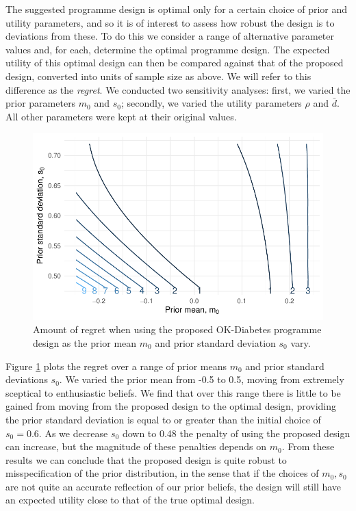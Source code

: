 \documentclass[sagev, Crown]{sagej} %
\begin{document}
The suggested programme design is optimal only for a certain choice of prior and utility parameters, and so it is of interest to assess how robust the design is to deviations from these. To do this we consider a range of alternative parameter values and, for each, determine the optimal programme design. The expected utility of this optimal design can then be compared against that of the proposed design, converted into units of sample size as above. We will refer to this difference as the \emph{regret}. We conducted two sensitivity analyses: first, we varied the prior parameters $m_0$ and $s_0$; secondly, we varied the utility parameters $\rho$ and $\bar{d}$. All other parameters were kept at their original values.

\begin{figure}
\centering
\includegraphics[scale=0.8]{./figures/sens_p.pdf}
\caption{Amount of regret when using the proposed OK-Diabetes programme design as the prior mean $m_0$ and prior standard deviation $s_0$ vary. }
\label{fig:sens_p}
\end{figure} 

Figure \ref{fig:sens_p} plots the regret over a range of prior means $m_0$ and prior standard deviations $s_0$. We varied the prior mean from -0.5 to 0.5, moving from extremely sceptical to enthusiastic beliefs. We find that over this range there is little to be gained from moving from the proposed design to the optimal design, providing the prior standard deviation is equal to or greater than the initial choice of $s_0 = 0.6$. As we decrease $s_0$ down to 0.48 the penalty of using the proposed design can increase, but the magnitude of these penalties depends on $m_0$. From these results we can conclude that the proposed design is quite robust to misspecification of the prior distribution, in the sense that if the choices of $m_0, s_0$ are not quite an accurate reflection of our prior beliefs, the design will still have an expected utility close to that of the true optimal design.
\end{document}
